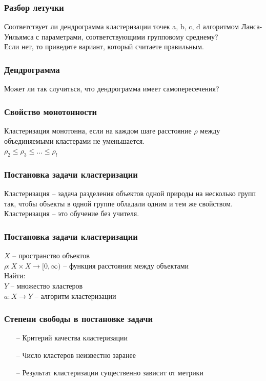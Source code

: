 \documentclass[12pt]{beamer}
\begin{document}
\begin{frame}\frametitle{Разбор летучки}
Соответствует ли дендрограмма кластеризации точек a, b, c, d алгоритмом Ланса-Уильямса с параметрами, соответствующими групповому среднему? \\
Если нет, то приведите вариант, который считаете правильным.
\end{frame}

\begin{frame}\frametitle{Дендрограмма}
Может ли так случиться, что дендрограмма имеет самопересечения?\\
\vspace{5mm}
\end{frame}

\begin{frame}\frametitle{Свойство монотонности}
Кластеризация монотонна, если на каждом шаге расстояние $\rho$ между объединяемыми кластерами не уменьшается.\\
$\rho_2 \leq \rho_3 \leq \dots \leq \rho_l$
\end{frame}

\begin{frame}\frametitle{Постановка задачи кластеризации}
Кластеризация -- задача разделения объектов одной природы на несколько групп так, чтобы объекты в одной группе обладали одним и тем же свойством.\\
\vspace{5mm}
Кластеризация -- это обучение без учителя.
\end{frame}

\begin{frame}\frametitle{Постановка задачи кластеризации}
$X$ -- пространство объектов\\
$\rho: X \times X \rightarrow [0, \infty)$ -- функция расстояния между объектами\\
\vspace{5mm}
Найти:\\
$Y$ -- множество кластеров \\
$a: X \rightarrow Y$ -- алгоритм кластеризации
\vspace{5mm}

\end{frame}

\begin{frame}\frametitle{Степени свободы в постановке задачи}
	\begin{itemize}
		\item[--] Критерий качества кластеризации
		\item[--] Число кластеров неизвестно заранее
		\item[--] Результат кластеризации существенно зависит от метрики
	\end{itemize}
\end{frame}
\end{document}
